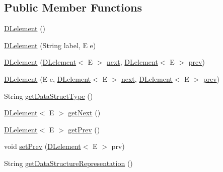 \subsection*{Public Member Functions}
\begin{DoxyCompactItemize}
\item 
\mbox{\hyperlink{classbridges_1_1base_1_1_d_lelement_a525b572340e161d9c430baff10b64ab2}{D\+Lelement}} ()
\item 
\mbox{\hyperlink{classbridges_1_1base_1_1_d_lelement_a6aa1d4a3dad4a196c2ed079d108562bc}{D\+Lelement}} (String label, E e)
\item 
\mbox{\hyperlink{classbridges_1_1base_1_1_d_lelement_ab1e4eace66bb1b097463c4f04e964cd0}{D\+Lelement}} (\mbox{\hyperlink{classbridges_1_1base_1_1_d_lelement}{D\+Lelement}}$<$ E $>$ \mbox{\hyperlink{classbridges_1_1base_1_1_s_lelement_abf61c96a74ad319d561c6952ea388e0e}{next}}, \mbox{\hyperlink{classbridges_1_1base_1_1_d_lelement}{D\+Lelement}}$<$ E $>$ \mbox{\hyperlink{classbridges_1_1base_1_1_d_lelement_a6eba4876f820b75ac6bde01d7dea9da7}{prev}})
\item 
\mbox{\hyperlink{classbridges_1_1base_1_1_d_lelement_a3ffba30204a2ea6939b07b0ded123af5}{D\+Lelement}} (E e, \mbox{\hyperlink{classbridges_1_1base_1_1_d_lelement}{D\+Lelement}}$<$ E $>$ \mbox{\hyperlink{classbridges_1_1base_1_1_s_lelement_abf61c96a74ad319d561c6952ea388e0e}{next}}, \mbox{\hyperlink{classbridges_1_1base_1_1_d_lelement}{D\+Lelement}}$<$ E $>$ \mbox{\hyperlink{classbridges_1_1base_1_1_d_lelement_a6eba4876f820b75ac6bde01d7dea9da7}{prev}})
\item 
String \mbox{\hyperlink{classbridges_1_1base_1_1_d_lelement_a4a0e8f7bd377a652927a741e70aae6d3}{get\+Data\+Struct\+Type}} ()
\item 
\mbox{\hyperlink{classbridges_1_1base_1_1_d_lelement}{D\+Lelement}}$<$ E $>$ \mbox{\hyperlink{classbridges_1_1base_1_1_d_lelement_a35e88e8d991d6f23ec63b3ef3f6cce4e}{get\+Next}} ()
\item 
\mbox{\hyperlink{classbridges_1_1base_1_1_d_lelement}{D\+Lelement}}$<$ E $>$ \mbox{\hyperlink{classbridges_1_1base_1_1_d_lelement_a859f08f38513ecdfff0eb11bd2b98ce7}{get\+Prev}} ()
\item 
void \mbox{\hyperlink{classbridges_1_1base_1_1_d_lelement_a152a06add922290d48b2d4affc87d592}{set\+Prev}} (\mbox{\hyperlink{classbridges_1_1base_1_1_d_lelement}{D\+Lelement}}$<$ E $>$ prv)
\item 
String \mbox{\hyperlink{classbridges_1_1base_1_1_d_lelement_aefe2e582992a9e574d733f109add80f2}{get\+Data\+Structure\+Representation}} ()
\end{DoxyCompactItemize}
